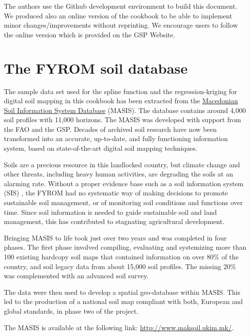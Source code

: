 \documentclass[10pt,b5paper,]{book}
\theoremstyle{definition}
\theoremstyle{definition}
\theoremstyle{definition}
\theoremstyle{remark}
\begin{document}
The authors use the Github development environment to build this
document. We produced also an online version of the cookbook to be able
to implement minor changes/improvements without reprinting. We encourage
users to follow the online version which is provided on the GSP Website.

\hypertarget{the-fyrom-soil-database}{%
\section{The FYROM soil database}\label{the-fyrom-soil-database}}

The sample data set used for the spline function and the
regression-kriging for digital soil mapping in this cookbook has been
extracted from the \href{http://www.maksoil.ukim.mk/}{Macedonian Soil
Information System Database} (MASIS). The database contains around 4,000
soil profiles with 11,000 horizons. The MASIS was developed with support
from the FAO and the GSP. Decades of archived soil research have now
been transformed into an accurate, up-to-date, and fully functioning
information system, based on state-of-the-art digital soil mapping
techniques.

Soils are a precious resource in this landlocked country, but climate
change and other threats, including heavy human activities, are
degrading the soils at an alarming rate. Without a proper evidence base
such as a soil information system (SIS)
, the FYROM had no
systematic way of making decisions to promote sustainable soil
management, or of monitoring soil conditions and functions over time.
Since soil information is needed to guide sustainable soil and land
management, this has contributed to stagnating agricultural development.

Bringing MASIS to life took just over two years and was completed in
four phases. The first phase involved compiling, evaluating and
systemizing more than 100 existing hardcopy soil maps that contained
information on over 80\% of the country, and soil legacy data from about
15,000 soil profiles. The missing 20\% was complemented with an advanced
soil survey.

The data were then used to develop a spatial geo-database within MASIS.
This led to the production of a national soil map compliant with both,
European and global standards, in phase two of the project.

The MASIS is available at the following link:
\url{http://www.maksoil.ukim.mk/}.
\end{document}
